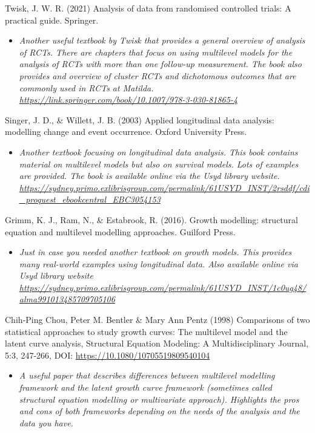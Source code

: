 \documentclass[
]{book}
\providecommand{\tightlist}{%
  \setlength{\itemsep}{0pt}\setlength{\parskip}{0pt}}
\begin{document}
Twisk, J. W. R. (2021) Analysis of data from randomised controlled trials: A practical guide. Springer.

\begin{itemize}
\tightlist
\item
  \emph{Another useful textbook by Twisk that provides a general overview of analysis of RCTs. There are chapters that focus on using multilevel models for the analysis of RCTs with more than one follow-up measurement. The book also provides and overview of cluster RCTs and dichotomous outcomes that are commonly used in RCTs at Matilda. \url{https://link.springer.com/book/10.1007/978-3-030-81865-4} }
\end{itemize}

Singer, J. D., \& Willett, J. B. (2003) Applied longitudinal data analysis: modelling change and event occurrence. Oxford University Press.

\begin{itemize}
\tightlist
\item
  \emph{Another textbook focusing on longitudinal data analysis. This book contains material on multilevel models but also on survival models. Lots of examples are provided. The book is available online via the Usyd library website. \url{https://sydney.primo.exlibrisgroup.com/permalink/61USYD_INST/2rsddf/cdi_proquest_ebookcentral_EBC3054153}}
\end{itemize}

Grimm, K. J., Ram, N., \& Estabrook, R. (2016). Growth modelling: structural equation and multilevel modelling approaches. Guilford Press.

\begin{itemize}
\tightlist
\item
  \emph{Just in case you needed another textbook on growth models. This provides many real-world examples using longitudinal data. Also available online via Usyd library website \url{https://sydney.primo.exlibrisgroup.com/permalink/61USYD_INST/1c0ug48/alma991013485709705106}}
\end{itemize}

Chih‐Ping Chou, Peter M. Bentler \& Mary Ann Pentz (1998) Comparisons of two statistical approaches to study growth curves: The multilevel model and the latent curve analysis, Structural Equation Modeling: A Multidisciplinary Journal, 5:3, 247-266, DOI: \url{https://10.1080/10705519809540104}

\begin{itemize}
\tightlist
\item
  \emph{A useful paper that describes differences between multilevel modelling framework and the latent growth curve framework (sometimes called structural equation modelling or multivariate approach). Highlights the pros and cons of both frameworks depending on the needs of the analysis and the data you have. }
\end{itemize}
\end{document}
